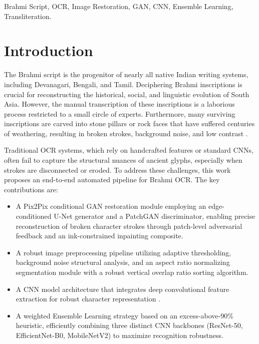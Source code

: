 \documentclass[conference]{IEEEtran}
\begin{document}
\begin{IEEEkeywords}
Brahmi Script, OCR, Image Restoration, GAN, CNN, Ensemble Learning, Transliteration.
\end{IEEEkeywords}

\section{Introduction}

The Brahmi script is the progenitor of nearly all native Indian writing systems, including Devanagari, Bengali, and Tamil. Deciphering Brahmi inscriptions is crucial for reconstructing the historical, social, and linguistic evolution of South Asia. However, the manual transcription of these inscriptions is a laborious process restricted to a small circle of experts. Furthermore, many surviving inscriptions are carved into stone pillars or rock faces that have suffered centuries of weathering, resulting in broken strokes, background noise, and low contrast \cite{prasad2024challenges}.

Traditional OCR systems, which rely on handcrafted features or standard CNNs, often fail to capture the structural nuances of ancient glyphs, especially when strokes are disconnected or eroded. To address these challenges, this work proposes an end-to-end automated pipeline for Brahmi OCR. The key contributions are:

\begin{itemize}
    \item A Pix2Pix conditional GAN restoration module employing an edge-conditioned U-Net generator and a PatchGAN discriminator, enabling precise reconstruction of broken character strokes through patch-level adversarial feedback and an ink-constrained inpainting composite.
    \item A robust image preprocessing pipeline utilizing adaptive thresholding, background noise structural analysis, and an aspect ratio normalizing segmentation module with a robust vertical overlap ratio sorting algorithm.
    \item A CNN model architecture that integrates deep convolutional feature extraction for robust character representation \cite{ramesh2025integrating}.
    \item A weighted Ensemble Learning strategy based on an excess-above-90\% heuristic, efficiently combining three distinct CNN backbones (ResNet-50, EfficientNet-B0, MobileNetV2) to maximize recognition robustness.
\end{itemize}
\end{document}
